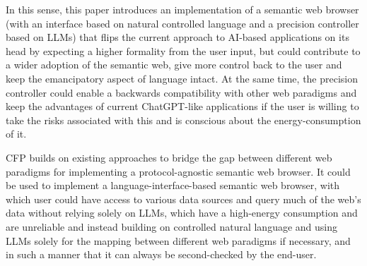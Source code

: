 \documentclass[12pt,a4paper]{article}
\begin{document}
In this sense, this paper introduces an implementation of a semantic web browser (with an interface based on natural controlled language and a precision controller based on LLMs) that flips the current approach to AI-based applications on its head by expecting a higher formality from the user input, but could contribute to a wider adoption of the semantic web, give more control back to the user and keep the emancipatory aspect of language intact. At the same time, the precision controller could enable a backwards compatibility with other web paradigms and keep the advantages of current ChatGPT-like applications if the user is willing to take the risks associated with this and is conscious about the energy-consumption of it.

CFP builds on existing approaches to bridge the gap between different web paradigms for implementing a protocol-agnostic semantic web browser. It could be used to implement a language-interface-based semantic web browser, with which user could have access to various data sources and query much of the web's data without relying solely on LLMs, which have a high-energy consumption and are unreliable and instead building on controlled natural language and using LLMs solely for the mapping between different web paradigms if necessary, and in such a manner that it can always be second-checked by the end-user.

\printbibliography
\end{document}

